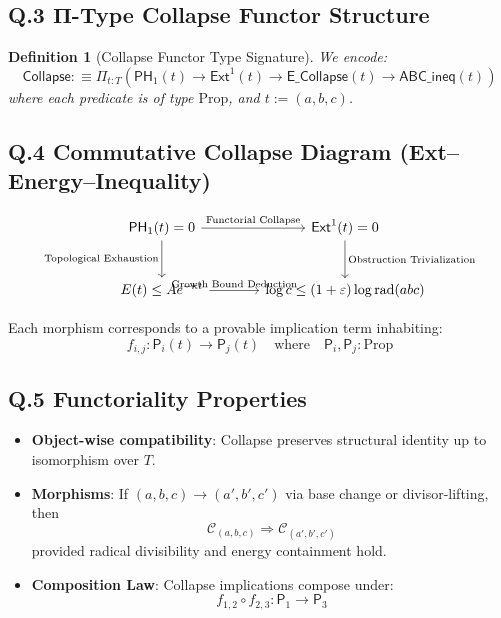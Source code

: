 \documentclass[11pt]{article}
\newtheorem{definition}[theorem]{Definition}
\begin{document}
\subsection*{Q.3 Π-Type Collapse Functor Structure}

\begin{definition}[Collapse Functor Type Signature]
We encode:
\[
\mathsf{Collapse} :\equiv \Pi_{t : T} \left(
  \mathsf{PH}_1(t) \to \mathsf{Ext}^1(t) \to \mathsf{E\_Collapse}(t) \to \mathsf{ABC\_ineq}(t)
\right)
\]
where each predicate is of type \( \mathrm{Prop} \), and \( t := (a,b,c) \).
\end{definition}

\subsection*{Q.4 Commutative Collapse Diagram (Ext–Energy–Inequality)}

\[
\begin{tikzcd}[row sep=large, column sep=large]
\mathsf{PH}_1(t) = 0 \arrow[r, "\text{Functorial Collapse}"] \arrow[d, swap, "\text{Topological Exhaustion}"]
& \mathsf{Ext}^1(t) = 0 \arrow[d, "\text{Obstruction Trivialization}"] \\
E(t) \leq Ae^{-\kappa t} \arrow[r, "\text{Growth Bound Deduction}"]
& \log c \leq (1+\varepsilon)\log \mathrm{rad}(abc)
\end{tikzcd}
\]

Each morphism corresponds to a provable implication term inhabiting:
\[
f_{i,j} : \mathsf{P}_i(t) \to \mathsf{P}_j(t) \quad \text{where} \quad \mathsf{P}_i, \mathsf{P}_j : \mathrm{Prop}
\]

\subsection*{Q.5 Functoriality Properties}

\begin{itemize}
  \item \textbf{Object-wise compatibility}: Collapse preserves structural identity up to isomorphism over \( T \).
  \item \textbf{Morphisms}: If \( (a,b,c) \to (a',b',c') \) via base change or divisor-lifting, then
  \[
  \mathcal{C}_{(a,b,c)} \Rightarrow \mathcal{C}_{(a',b',c')}
  \]
  provided radical divisibility and energy containment hold.
  \item \textbf{Composition Law}: Collapse implications compose under:
  \[
  f_{1,2} \circ f_{2,3} : \mathsf{P}_1 \to \mathsf{P}_3
  \]
\end{itemize}
\end{document}
